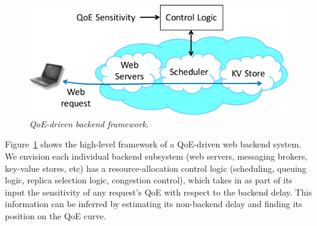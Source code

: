 \begin{figure}
	\centering
	\includegraphics[width=1.0\textwidth]{figs/framework.pdf}
	\caption{\em QoE-driven backend framework.}
	\label{fig:framework}
\end{figure}
 Figure~\ref{fig:framework} shows the high-level framework of a QoE-driven web backend system.
We envision each individual backend subsystem (web servers, messaging brokers, key-value stores, etc) has a resource-allocation control logic (\eg scheduling, queuing logic, replica selection logic, congestion control), which takes in as part of its input the sensitivity of any request's QoE with respect to the backend delay.
This information can be inferred by estimating its non-backend delay and finding its position on the QoE curve. 


